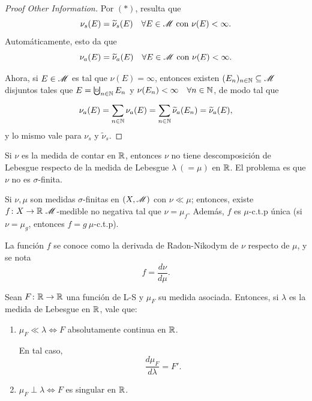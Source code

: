 \begin{proof}[Proof Other Information]
	Por $(*)$, resulta que
	\[ \nu_{s}(E) = \widetilde{\nu}_{s}(E) \quad \forall E \in \mathscr{M} \text{ con } \nu(E) < \infty. \]
	Automáticamente, esto da que 
	\[ \nu_{a}(E) = \widetilde{\nu}_{a}(E) \quad \forall E \in \mathscr{M} \text{ con } \nu(E) < \infty. \]
	\par
	Ahora, si $E \in \mathscr{M}$ es tal que $\nu(E) = \infty$, entonces existen $(E_{n})_{n \in \mathbb{N}} \subseteq \mathscr{M}$ disjuntos tales que $E = \textbigcupd_{n \in \N} E_{n}$ y $\nu(E_{n}) < \infty \quad \forall n \in \mathbb{N}$, de modo tal que
	\[ \nu_{a}(E) = \sum_{n \in \mathbb{N}}^{} \nu_{a}(E) = \sum_{n \in \mathbb{N}}^{} \widetilde{\nu}_{a}(E_{n}) = \widetilde{\nu}_{a}(E), \]
	y lo mismo vale para $\nu_{s}$ y $\widetilde{\nu}_{s}$.
\end{proof}

\begin{note}
	Si $\nu$ es la medida de contar en $\mathbb{R}$, entonces $\nu$ no tiene descomposición de Lebesgue respecto de la medida de Lebesgue $\lambda \ (= \mu)$ en $\mathbb{R}$. El problema es que $\nu$ no es $\sigma$-finita.
\end{note}

\begin{corollary}
	Si $\nu,\mu$ son medidas $\sigma$-finitas en $(X, \mathscr{M})$ con $\nu \ll \mu$; entonces, existe $f \colon X \to \R \ \mscr{M}$-medible no negativa tal que $\nu = \mu_{f}$. Además, $f$ es $\mu$-c.t.p única (si $\nu = \mu_{g}$, entonces $f = g \ \mu$-c.t.p). \par
	La función $f$ se conoce como la derivada de Radon-Nikodym de $\nu$ respecto de $\mu$, y se nota
	\[ f = \frac{d\nu}{d\mu}. \]
\end{corollary}

\begin{prop}
	Sean $F \colon \mathbb{R} \to \mathbb{R}$ una función de L-S y $\mu_{F}$ su medida asociada. Entonces, si $\lambda$ es la medida de Lebesgue en $\mathbb{R}$, vale que:
	\begin{enumerate}
		\item $\mu_{F} \ll \lambda \iff F$ absolutamente continua en $\mathbb{R}$. \par
		En tal caso,
		\[ \frac{d\mu_{F}}{d\lambda} = F'. \]

		\item $\mu_{F} \perp \lambda \iff F$ es singular en $\mathbb{R}$.
	\end{enumerate}
\end{prop}

